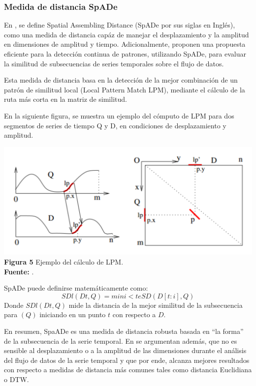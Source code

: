 \subsubsection{\textbf{Medida de distancia SpADe}}
En \cite{spade}, se define Spatial Assembling Distance
(SpADe por sus siglas en Ingl\'es), como una medida de distancia cap\'az de manejar el desplazamiento y la amplitud en dimensiones de amplitud y tiempo. Adicionalmente, proponen una propuesta eficiente para la detecci\'on continua de patrones, utilizando SpADe, para evaluar la similitud de subsecuencias de series temporales sobre el flujo de datos.\par
Esta medida de distancia basa en la detecci\'on de la mejor combinaci\'on de un patr\'on de similitud local (Local Pattern Match LPM), mediante el c\'alculo de la ruta m\'as corta en la matriz de similitud.\par 
En la siguiente figura, se muestra un ejemplo del c\'omputo de LPM para dos segmentos de series de tiempo Q y D, en condiciones de desplazamiento y amplitud.
\begin{center}
\includegraphics[scale=0.9]{spade.png}\\
\vspace*{10pt}
\footnotesize{\textbf{Figura 5} Ejemplo del c\'alculo de LPM.}\\ \textbf{Fuente:} \cite{swale}.
\end{center}
SpADe puede definirse matem\'aticamente como:
\begin{equation}
SDl(Dt, Q) = mini<te SD(D[t : i], Q)
\end{equation}
Donde $SDl(Dt, Q)$ mide la distancia de la mejor similitud de la subsecuencia para $(Q)$ iniciando en un punto $t$ con respecto a $D$.\par
En resumen, SpaADe es una medida de distancia robusta basada en \enquote{la forma} de la subsecuencia de la serie temporal. En \cite{spade} se argumentan adem\'as, que no es sensible al desplazamiento o a la amplitud de las dimensiones durante el an\'alisis del flujo de datos de la serie temporal y que por ende, alcanza mejores resultados con respecto a medidas de distancia m\'as comunes tales como distancia Euclidiana o DTW.
